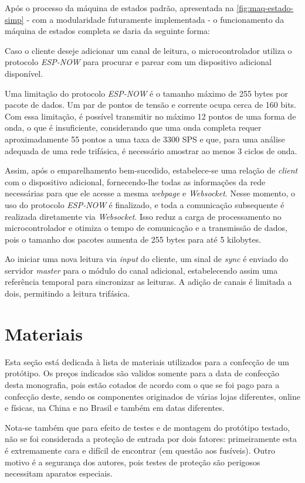 Após o processo da máquina de estados padrão, apresentada na \autoref{fig:maq-estado-simp} - com a modularidade futuramente implementada - o funcionamento da máquina de estados completa se daria da seguinte forma:

Caso o cliente deseje adicionar um canal de leitura, o microcontrolador utiliza o protocolo \textit{ESP-NOW} para procurar e parear com um dispositivo adicional disponível.

Uma limitação do protocolo \textit{ESP-NOW} é o tamanho máximo de 255 bytes por pacote de dados. Um par de pontos de tensão e corrente ocupa cerca de 160 bits. Com essa limitação, é possível transmitir no máximo 12 pontos de uma forma de onda, o que é insuficiente, considerando que uma onda completa requer aproximadamente 55 pontos a uma taxa de 3300 \gls{SPS} e que, para uma análise adequada de uma rede trifásica, é necessário amostrar ao menos 3 ciclos de onda.

Assim, após o emparelhamento bem-sucedido, estabelece-se uma relação de \textit{client} com o dispositivo adicional, fornecendo-lhe todas as informações da rede necessárias para que ele acesse a mesma \textit{webpage} e \textit{Websocket}. Nesse momento, o uso do protocolo \textit{ESP-NOW} é finalizado, e toda a comunicação subsequente é realizada diretamente via \textit{Websocket}. Isso reduz a carga de processamento no microcontrolador e otimiza o tempo de comunicação e a transmissão de dados, pois o tamanho dos pacotes aumenta de 255 bytes para até 5 kilobytes.

Ao iniciar uma nova leitura via \textit{input} do cliente, um sinal de \textit{sync} é enviado do servidor \textit{master} para o módulo do canal adicional, estabelecendo assim uma referência temporal para sincronizar as leituras. A adição de canais é limitada a dois, permitindo a leitura trifásica.

\section{Materiais}\label{sec:materiais}

Esta seção está dedicada à lista de materiais utilizados para a confecção de um protótipo. Os preços indicados são validos somente para a data de confecção desta monografia, pois estão cotados de acordo com o que se foi pago para a confecção deste, sendo os componentes originados de várias lojas diferentes, online e físicas, na China e no Brasil e também em datas diferentes.

Nota-se também que para efeito de testes e de montagem do protótipo testado, não se foi considerada a proteção de entrada por dois fatores: primeiramente esta é extremamente cara e difícil de encontrar (em questão aos fusíveis). Outro motivo é a segurança dos autores, pois testes de proteção são perigosos necessitam aparatos especiais.

